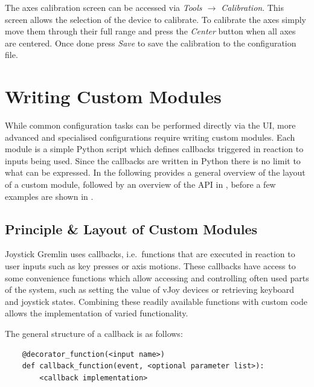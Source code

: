 \documentclass[a4, 10pt]{article}
\begin{document}
The axes calibration screen can be accessed via \emph{Tools
$\rightarrow$ Calibration}. This screen allows the selection of the
device to calibrate. To calibrate the axes simply move them through
their full range and press the \emph{Center} button when all axes are
centered. Once done press \emph{Save} to save the calibration to the
configuration file.



\section{Writing Custom Modules}
\label{sec:custom_modules}

While common configuration tasks can be performed directly via the UI,
more advanced and specialised configurations require writing custom
modules. Each module is a simple Python script which defines callbacks
triggered in reaction to inputs being used. Since the callbacks are
written in Python there is no limit to what can be expressed. In the
following  provides a general overview of the
layout of a custom module, followed by an overview of the API in
, before a few examples are shown in
.


\subsection{Principle \& Layout of Custom Modules}
\label{sec:cm_principles}

Joystick Gremlin uses callbacks, i.e.\ functions that are executed in
reaction to user inputs such as key presses or axis motions. These
callbacks have access to some convenience functions which allow
accessing and controlling often used parts of the system, such as
setting the value of vJoy devices or retrieving keyboard and joystick
states. Combining these readily available functions with custom code
allows the implementation of varied functionality.

The general structure of a callback is as follows:
\begin{verbatim}
    @decorator_function(<input name>)
    def callback_function(event, <optional parameter list>):
        <callback implementation>
\end{verbatim}
\end{document}

